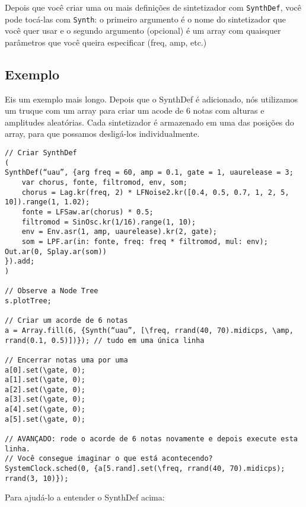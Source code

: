 Depois que você criar uma ou mais definições de sintetizador com \texttt{SynthDef}, você pode tocá-las com \texttt{Synth}: o primeiro argumento é o nome do sintetizador que você quer usar e o segundo argumento (opcional) é um array com quaisquer parâmetros que você queira especificar (freq, amp, etc.)

\subsection{Exemplo}

Eis um exemplo mais longo. Depois que o SynthDef é adicionado, nós utilizamos um truque com um array para criar um acode de 6 notas com alturas e amplitudes aleatórias. Cada sintetizador é armazenado em uma das posições do array, para que possamos desligá-los individualmente. 
 
\begin{lstlisting}[style=SuperCollider-IDE, basicstyle=\scttfamily\footnotesize]
// Criar SynthDef
(
SynthDef(“uau”, {arg freq = 60, amp = 0.1, gate = 1, uaurelease = 3;
	var chorus, fonte, filtromod, env, som;
	chorus = Lag.kr(freq, 2) * LFNoise2.kr([0.4, 0.5, 0.7, 1, 2, 5, 10]).range(1, 1.02);
	fonte = LFSaw.ar(chorus) * 0.5;
	filtromod = SinOsc.kr(1/16).range(1, 10);
	env = Env.asr(1, amp, uaurelease).kr(2, gate);
	som = LPF.ar(in: fonte, freq: freq * filtromod, mul: env);
Out.ar(0, Splay.ar(som))
}).add;
)

// Observe a Node Tree
s.plotTree;

// Criar um acorde de 6 notas
a = Array.fill(6, {Synth(“uau”, [\freq, rrand(40, 70).midicps, \amp, rrand(0.1, 0.5)])}); // tudo em uma única linha

// Encerrar notas uma por uma
a[0].set(\gate, 0);
a[1].set(\gate, 0);
a[2].set(\gate, 0);
a[3].set(\gate, 0);
a[4].set(\gate, 0);
a[5].set(\gate, 0);

// AVANÇADO: rode o acorde de 6 notas novamente e depois execute esta linha.
// Você consegue imaginar o que está acontecendo?
SystemClock.sched(0, {a[5.rand].set(\freq, rrand(40, 70).midicps); rrand(3, 10)});
\end{lstlisting}

Para ajudá-lo a entender o SynthDef acima:

